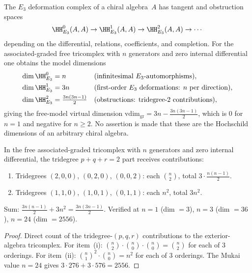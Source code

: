 The \(E_3\) deformation complex of a chiral algebra~\(A\) has tangent
and obstruction spaces
\begin{equation}\label{eq:e3-tangent-obstruction}
 \HH^0_{E_3}(A,A) \to \HH^1_{E_3}(A,A) \to \HH^2_{E_3}(A,A) \to \cdots
\end{equation}
depending on the differential, relations, coefficients, and
completion.  For the associated-graded free tricomplex with \(n\)
generators and zero internal differential one obtains the model
dimensions
\begin{align}
 \dim \HH^0_{E_3} &= n & &\text{(infinitesimal $E_3$-automorphisms)}, \label{eq:hh0-dim} \\
 \dim \HH^1_{E_3} &= 3n & &\text{(first-order $E_3$ deformations: $n$ per direction)}, \label{eq:hh1-dim} \\
 \dim \HH^2_{E_3} &= \tfrac{3n(3n-1)}{2} & &\text{(obstructions: tridegree-$2$ contributions)}, \label{eq:hh2-dim}
\end{align}
giving the free-model virtual dimension
\(\mathrm{vdim}_{\mathrm{gr}} = 3n - \tfrac{3n(3n-1)}{2}\), which is
\(0\) for \(n = 1\) and negative for \(n \geq 2\).  No assertion is made
that these are the Hochschild dimensions of an arbitrary chiral algebra.

\begin{proposition}
\label{prop:hh2-tridegree}
In the free associated-graded tricomplex with \(n\) generators and zero
internal differential, the tridegree \(p + q + r = 2\) part receives
contributions:
\begin{enumerate}[label=\textup{(\roman*)}]
 \item Tridegrees $(2,0,0)$, $(0,2,0)$, $(0,0,2)$: each $\binom{n}{2}$, total $3 \cdot \tfrac{n(n-1)}{2}$.
 \item Tridegrees $(1,1,0)$, $(1,0,1)$, $(0,1,1)$: each $n^2$, total $3n^2$.
\end{enumerate}
Sum: $\tfrac{3n(n-1)}{2} + 3n^2 = \tfrac{3n(3n-1)}{2}$. Verified at $n = 1$ (dim $= 3$), $n = 3$ (dim $= 36$), $n = 24$ (dim $= 2556$).
\end{proposition}

\begin{proof}
Direct count of the tridegree-$(p,q,r)$ contributions to the exterior-algebra tricomplex. For item~(i): $\binom{n}{2} \cdot \binom{n}{0} \cdot \binom{n}{0} = \binom{n}{2}$ for each of $3$ orderings. For item~(ii): $\binom{n}{1}^2 \cdot \binom{n}{0} = n^2$ for each of $3$ orderings. The Mukai value $n = 24$ gives \(3\cdot276+3\cdot576=2556\).
\end{proof}



